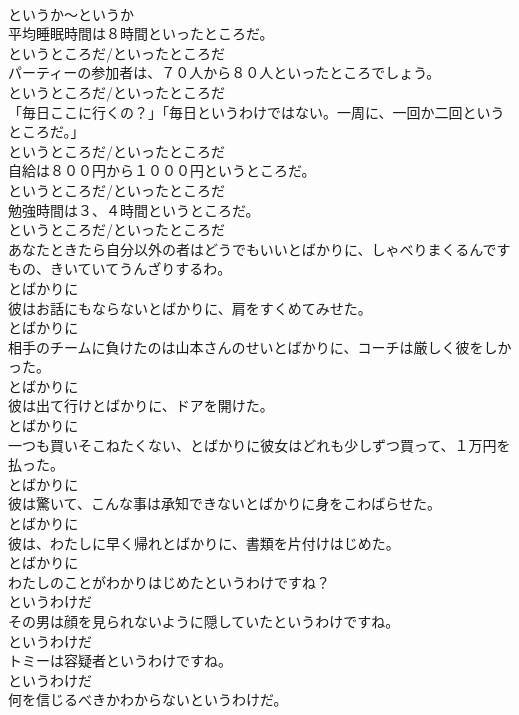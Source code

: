 \documentclass[8pt]{extreport}
\begin{document}
\begin{CJK}{UTF8}{min}
\\	というか～というか
\\	平均睡眠時間は８時間といったところだ。	
\\	というところだ/といったところだ
\\	パーティーの参加者は、７０人から８０人といったところでしょう。	
\\	というところだ/といったところだ
\\	「毎日ここに行くの？」「毎日というわけではない。一周に、一回か二回というところだ。」	
\\	というところだ/といったところだ
\\	自給は８００円から１０００円というところだ。	
\\	というところだ/といったところだ
\\	勉強時間は３、４時間というところだ。	
\\	というところだ/といったところだ
\\	あなたときたら自分以外の者はどうでもいいとばかりに、しゃべりまくるんですもの、きいていてうんざりするわ。	
\\	とばかりに
\\	彼はお話にもならないとばかりに、肩をすくめてみせた。	
\\	とばかりに
\\	相手のチームに負けたのは山本さんのせいとばかりに、コーチは厳しく彼をしかった。	
\\	とばかりに
\\	彼は出て行けとばかりに、ドアを開けた。	
\\	とばかりに
\\	一つも買いそこねたくない、とばかりに彼女はどれも少しずつ買って、１万円を払った。	
\\	とばかりに
\\	彼は驚いて、こんな事は承知できないとばかりに身をこわばらせた。	
\\	とばかりに
\\	彼は、わたしに早く帰れとばかりに、書類を片付けはじめた。	
\\	とばかりに
\\	わたしのことがわかりはじめたというわけですね？	
\\	というわけだ
\\	その男は顔を見られないように隠していたというわけですね。	
\\	というわけだ
\\	トミーは容疑者というわけですね。	
\\	というわけだ
\\	何を信じるべきかわからないというわけだ。	

\end{CJK}
\end{document}
